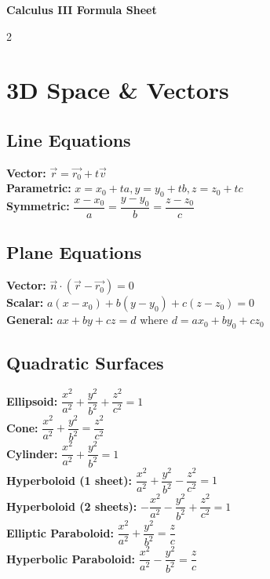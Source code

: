 \documentclass[8pt]{extarticle}
\begin{document}
\begin{center}
\textbf{\Large Calculus III Formula Sheet}
\end{center}

\begin{multicols}{2}
\setlength{\columnsep}{0.2in}
\setlength{\columnseprule}{0.4pt}

\section*{3D Space \& Vectors}

\subsection*{Line Equations}
\textbf{Vector:} $\vec{r} = \vec{r_0} + t\vec{v}$ \\
\textbf{Parametric:} $x = x_0 + ta, y = y_0 + tb, z = z_0 + tc$ \\
\textbf{Symmetric:} $\dfrac{x-x_0}{a} = \dfrac{y-y_0}{b} = \dfrac{z-z_0}{c}$

\subsection*{Plane Equations}
\textbf{Vector:} $\vec{n} \cdot (\vec{r} - \vec{r_0}) = 0$ \\
\textbf{Scalar:} $a(x-x_0) + b(y-y_0) + c(z-z_0) = 0$ \\
\textbf{General:} $ax + by + cz = d$ where $d = ax_0 + by_0 + cz_0$

\subsection*{Quadratic Surfaces}
\textbf{Ellipsoid:} $\dfrac{x^2}{a^2} + \dfrac{y^2}{b^2} + \dfrac{z^2}{c^2} = 1$ \\
\textbf{Cone:} $\dfrac{x^2}{a^2} + \dfrac{y^2}{b^2} = \dfrac{z^2}{c^2}$ \\
\textbf{Cylinder:} $\dfrac{x^2}{a^2} + \dfrac{y^2}{b^2} = 1$ \\
\textbf{Hyperboloid (1 sheet):} $\dfrac{x^2}{a^2} + \dfrac{y^2}{b^2} - \dfrac{z^2}{c^2} = 1$ \\
\textbf{Hyperboloid (2 sheets):} $-\dfrac{x^2}{a^2} - \dfrac{y^2}{b^2} + \dfrac{z^2}{c^2} = 1$ \\
\textbf{Elliptic Paraboloid:} $\dfrac{x^2}{a^2} + \dfrac{y^2}{b^2} = \dfrac{z}{c}$ \\
\textbf{Hyperbolic Paraboloid:} $\dfrac{x^2}{a^2} - \dfrac{y^2}{b^2} = \dfrac{z}{c}$


\end{multicols}
\end{document}
